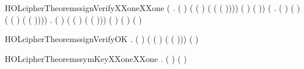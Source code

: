 \newcommand{\HOLcipherTheoremssignXXoneXXone}{\UseVerbatim{HOLcipherTheoremssignXXoneXXone}}
\begin{SaveVerbatim}{HOLcipherTheoremssignVerifyXXoneXXone}
\HOLTokenTurnstile{} (\HOLSymConst{\HOLTokenForall{}}  .
       ( ) ( ( ) ( ( ( ))))
        ( ) \HOLSymConst{\HOLTokenEquiv{}} ( \HOLSymConst{=} )) \HOLSymConst{\HOLTokenConj{}}
   (\HOLSymConst{\HOLTokenForall{}}  .
       ( )  ( ) \HOLSymConst{\HOLTokenEquiv{}}
      ( \HOLSymConst{=}  ( ) ( ( )))) \HOLSymConst{\HOLTokenConj{}}
   \HOLSymConst{\HOLTokenForall{}}   .
      ( ) ( ( ) ( ( )))
       ( ) \HOLSymConst{\HOLTokenEquiv{}} ( \HOLSymConst{=} ) \HOLSymConst{\HOLTokenConj{}} ( \HOLSymConst{=} )
\end{SaveVerbatim}
\newcommand{\HOLcipherTheoremssignVerifyXXoneXXone}{\UseVerbatim{HOLcipherTheoremssignVerifyXXoneXXone}}
\begin{SaveVerbatim}{HOLcipherTheoremssignVerifyOK}
\HOLTokenTurnstile{} \HOLSymConst{\HOLTokenForall{}} .
      ( ) ( ( ) ( ( )))
       ( )
\end{SaveVerbatim}
\newcommand{\HOLcipherTheoremssignVerifyOK}{\UseVerbatim{HOLcipherTheoremssignVerifyOK}}
\begin{SaveVerbatim}{HOLcipherTheoremssymKeyXXoneXXone}
\HOLTokenTurnstile{} \HOLSymConst{\HOLTokenForall{}} . (  \HOLSymConst{=}  ) \HOLSymConst{\HOLTokenEquiv{}} ( \HOLSymConst{=} )
\end{SaveVerbatim}
